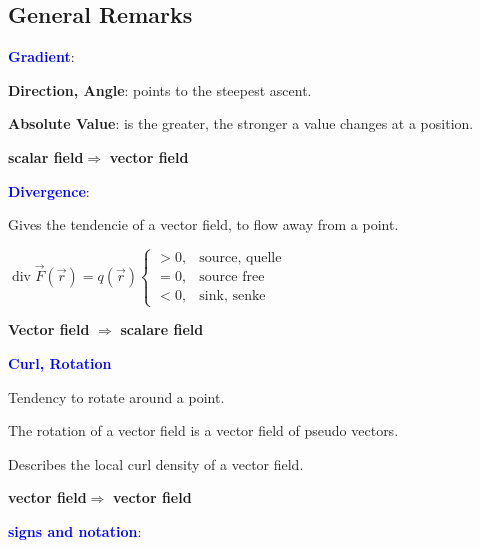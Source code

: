 
		\subsection{General Remarks}		
		\textcolor{blue}{\textbf{Gradient}}: 

		\textbf{Direction, Angle}: points to the steepest ascent.
		
		\textbf{Absolute Value}: is the greater, the stronger a value changes at a position.
		
		\textbf{scalar field}$\Rightarrow$ \textbf{vector field}
				
		\textcolor{blue}{\textbf{Divergence}}:
		
		Gives the tendencie of a vector field, to flow away from a point.
		
		$\operatorname{div}\vec F(\vec r) = q(\vec r) \begin{cases}
			> 0, & \text{source, quelle}\\
			= 0, & \text{source free}\\
			< 0, & \text{sink, senke}
		\end{cases}$
		
		\textbf{Vector field} $\Rightarrow$ \textbf{scalare field}
		
		\textcolor{blue}{\textbf{Curl, Rotation}}
		
		Tendency to rotate around a point. 
		
		The rotation of a vector field is a vector field of pseudo vectors. 
		
		Describes the local curl density of a vector field.		
		
		\textbf{vector field}$\Rightarrow$ \textbf{vector field}

		\textcolor{blue}{\textbf{signs and notation}}: 
		
